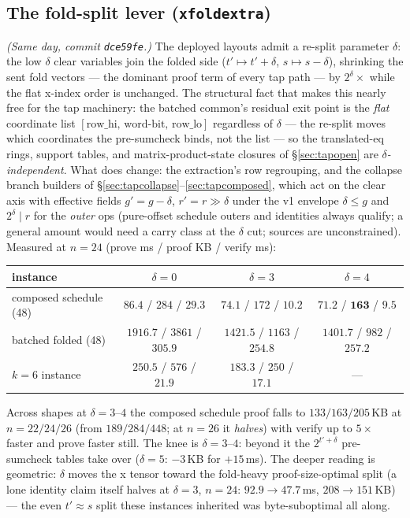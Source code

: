 \documentclass[11pt]{article}
\DeclareRobustCommand{\code}[1]{{\def\_{\textunderscore\allowbreak}\texttt{#1}}}
\theoremstyle{plain}
\theoremstyle{definition}
\theoremstyle{remark}
\begin{document}
\subsection{The fold-split lever (\code{x\_fold\_extra})}
\label{sec:tapdelta}

\emph{(Same day, commit \texttt{dce59fe}.)} The deployed layouts
admit a re-split parameter $\delta$: the low $\delta$ clear variables
join the folded side ($t'\mapsto t'+\delta$, $s\mapsto s-\delta$),
shrinking the sent fold vectors --- the dominant proof term of every
tap path --- by $2^{\delta}\times$ while the flat x-index order is
unchanged. The structural fact that makes this nearly free for the
tap machinery: the batched common's residual exit point is the
\emph{flat} coordinate list $[\mathrm{row\_hi},\,\text{word-bit},\,
\mathrm{row\_lo}]$ regardless of $\delta$ --- the re-split moves
which coordinates the pre-sumcheck binds, not the list --- so the
translated-eq rings, support tables, and matrix-product-state
closures of \S\ref{sec:tapopen} are \emph{$\delta$-independent}.
What does change: the extraction's row regrouping, and the collapse
branch builders of \S\ref{sec:tapcollapse}--\ref{sec:tapcomposed},
which act on the clear axis with effective fields $g'=g-\delta$,
$r'=r\gg\delta$ under the v1 envelope $\delta\le g$ and
$2^{\delta}\mid r$ for the \emph{outer} ops (pure-offset schedule
outers and identities always qualify; a general amount would need a
carry class at the $\delta$ cut; sources are unconstrained).
Measured at $n{=}24$ (prove ms / proof KB / verify ms):

\begin{center}\small
\begin{tabular}{@{}lccc@{}}
\toprule
instance & $\delta=0$ & $\delta=3$ & $\delta=4$\\
\midrule
composed schedule (48) & $86.4$ / $284$ / $29.3$ & $74.1$ / $172$ / $10.2$ & $\mathbf{71.2}$ / $\mathbf{163}$ / $\mathbf{9.5}$\\
batched folded (48) & $1916.7$ / $3861$ / $305.9$ & $1421.5$ / $1163$ / $254.8$ & $1401.7$ / $982$ / $257.2$\\
$k{=}6$ instance & $250.5$ / $576$ / $21.9$ & $183.3$ / $250$ / $17.1$ & ---\\
\bottomrule
\end{tabular}
\end{center}

\noindent Across shapes at $\delta{=}3$--$4$ the composed schedule
proof falls to $133/163/205$\,KB at $n=22/24/26$ (from
$189/284/448$; at $n{=}26$ it \emph{halves}) with verify up to
$5\times$ faster and prove faster still. The knee is
$\delta=3$--$4$: beyond it the $2^{t'+\delta}$ pre-sumcheck tables
take over ($\delta{=}5$: $-3$\,KB for $+15$\,ms). The deeper reading
is geometric: $\delta$ moves the x tensor toward the fold-heavy
proof-size-optimal split (a lone identity claim itself halves at
$\delta{=}3$, $n{=}24$: $92.9\to47.7$\,ms, $208\to151$\,KB) --- the
even $t'\approx s$ split these instances inherited was
byte-suboptimal all along.
\end{document}
